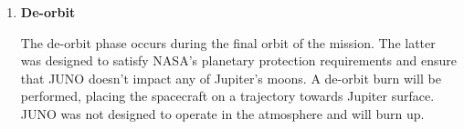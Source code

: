 \begin{enumerate}
    \item \textbf{De-orbit}
    
    The de-orbit phase occurs during the final orbit of the mission. The latter was designed to satisfy NASA's planetary protection requirements and ensure that JUNO doesn't impact any of Jupiter's moons. A de-orbit burn will be performed, placing the spacecraft on a trajectory towards Jupiter surface.
    JUNO was not designed to operate in the atmosphere and will burn up.
    
     
\end{enumerate}